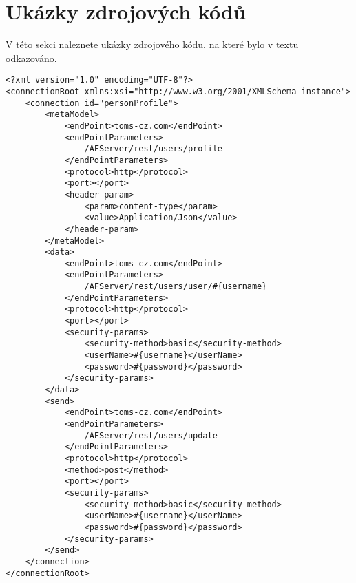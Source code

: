 \chapter{Ukázky zdrojových kódů}
V této sekci naleznete ukázky zdrojového kódu, na které bylo v textu odkazováno.

\begin{lstlisting}[caption=Ukázka XML specifikace zdrojů,
label={code:xmlSource}, basicstyle=\footnotesize]
<?xml version="1.0" encoding="UTF-8"?>
<connectionRoot xmlns:xsi="http://www.w3.org/2001/XMLSchema-instance">
	<connection id="personProfile">
		<metaModel>
			<endPoint>toms-cz.com</endPoint>
			<endPointParameters>
				/AFServer/rest/users/profile
			</endPointParameters>
			<protocol>http</protocol>
			<port></port>
			<header-param>
				<param>content-type</param>
				<value>Application/Json</value>
			</header-param>
		</metaModel>
		<data>
			<endPoint>toms-cz.com</endPoint>
			<endPointParameters>
				/AFServer/rest/users/user/#{username}
			</endPointParameters>
			<protocol>http</protocol>
			<port></port>
			<security-params>
				<security-method>basic</security-method>
				<userName>#{username}</userName>
				<password>#{password}</password>
			</security-params>
		</data>
		<send>
			<endPoint>toms-cz.com</endPoint>
			<endPointParameters>
				/AFServer/rest/users/update
			</endPointParameters>
			<protocol>http</protocol>
			<method>post</method>
			<port></port>
			<security-params>
				<security-method>basic</security-method>
				<userName>#{username}</userName>
				<password>#{password}</password>
			</security-params>
		</send>
	</connection>
</connectionRoot>
\end{lstlisting}